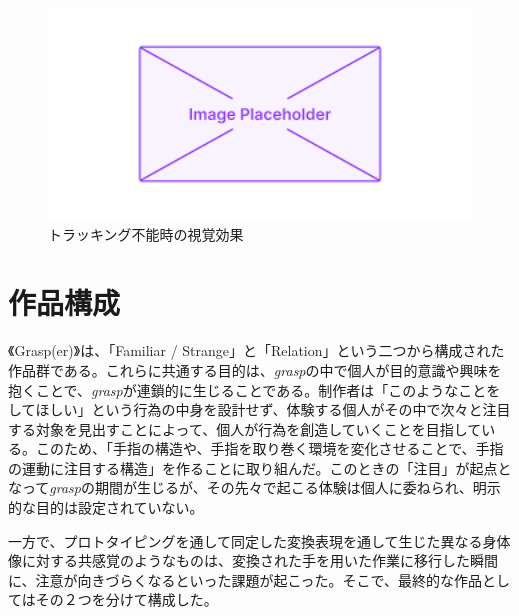 \begin{figure}[H]
  \centering
  \includegraphics[width=15cm]{img/placeholder.png}
  \caption{トラッキング不能時の視覚効果}
  \label{fig:opacity}
\end{figure}

\section{作品構成}
《Grasp(er)》は、「Familiar / Strange」と「Relation」という二つから構成された作品群である。これらに共通する目的は、\textit{grasp}の中で個人が目的意識や興味を抱くことで、\textit{grasp}が連鎖的に生じることである。制作者は「このようなことをしてほしい」という行為の中身を設計せず、体験する個人がその中で次々と注目する対象を見出すことによって、個人が行為を創造していくことを目指している。このため、「手指の構造や、手指を取り巻く環境を変化させることで、手指の運動に注目する構造」を作ることに取り組んだ。このときの「注目」が起点となって\textit{grasp}の期間が生じるが、その先々で起こる体験は個人に委ねられ、明示的な目的は設定されていない。

一方で、プロトタイピングを通して同定した変換表現を通して生じた異なる身体像に対する共感覚のようなものは、変換された手を用いた作業に移行した瞬間に、注意が向きづらくなるといった課題が起こった。そこで、最終的な作品としてはその２つを分けて構成した。

